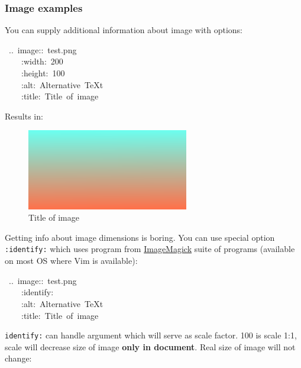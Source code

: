 \documentclass[12pt]{article}
\begin{document}
\subsubsection{Image examples}

You can supply additional information about image with options:

\begin{ttfamily}\begin{flushleft}
\mbox{~..~image::~test.png}\\
\mbox{~~~~:width:~200}\\
\mbox{~~~~:height:~100}\\
\mbox{~~~~:alt:~Alternative~\TeX{}t}\\
\mbox{~~~~:title:~Title~of~image}\\
\end{flushleft}\end{ttfamily}

Results in:

\begin{figure}[ht]\centering\includegraphics[height=100pt, width=200pt]{test.png}\caption{Title of image}\end{figure}
Getting info about image dimensions is boring. You can use special
option \texttt{:identify:} which uses program from \href{http://www.imagemagick.org}{ImageMagick} suite
of programs (available on most OS where Vim is available):

\begin{ttfamily}\begin{flushleft}
\mbox{~..~image::~test.png}\\
\mbox{~~~~:identify:}\\
\mbox{~~~~:alt:~Alternative~\TeX{}t}\\
\mbox{~~~~:title:~Title~of~image}\\
\end{flushleft}\end{ttfamily}

\texttt{identify:} can handle argument which will serve as scale factor. 100
is scale 1:1, scale will decrease size of image \textbf{only in document}. Real
size of image will not change:
\end{document}
